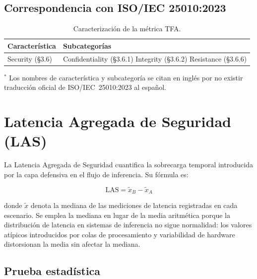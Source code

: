\subsection{Correspondencia con ISO/IEC 25010:2023}

\begin{table}[H]
  \centering
  \caption{Caracterización de la métrica TFA.}
  \label{tab:caract-tfa}
  \renewcommand{\arraystretch}{1.4}
  \begin{tabular}{
    >{\raggedright\arraybackslash}m{4cm}
    >{\raggedright\arraybackslash}m{7.5cm}
  }
  \toprule
  \textbf{Característica} & \textbf{Subcategorías} \\
  \midrule
  Security (\S3.6) &
    Confidentiality (\S3.6.1) \newline
    Integrity (\S3.6.2) \newline
    Resistance (\S3.6.6) \\
  \bottomrule
  \end{tabular}
  \vspace{0.3em}
  \begin{minipage}{11.5cm}
    \raggedright\small
    $^*$ Los nombres de característica y subcategoría se citan en inglés
    por no existir traducción oficial de ISO/IEC~25010:2023 al español.
  \end{minipage}
\end{table}

\section{Latencia Agregada de Seguridad (LAS)}
\label{sec:las}

La Latencia Agregada de Seguridad cuantifica la sobrecarga temporal
introducida por la capa defensiva en el flujo de inferencia. Su fórmula es:

\[
  \text{LAS} = \tilde{x}_B - \tilde{x}_A
\]

donde $\tilde{x}$ denota la mediana de las mediciones de latencia
registradas en cada escenario. Se emplea la mediana en lugar de la
media aritmética porque la distribución de latencia en sistemas de
inferencia no sigue normalidad: los valores atípicos introducidos por
colas de procesamiento y variabilidad de hardware distorsionan la
media sin afectar la mediana.

\subsection{Prueba estadística}

